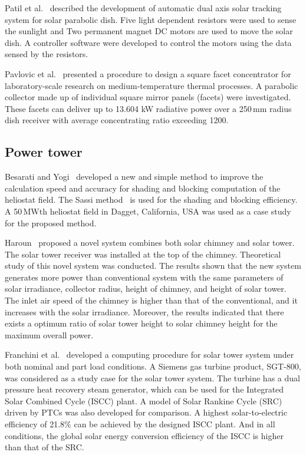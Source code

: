 Patil et al.~\cite{Patil2016} described the development of automatic dual axis solar tracking system for solar parabolic dish. Five light dependent resistors were used to sense the sunlight and Two permanent magnet DC motors are used to move the solar dish. A controller software were developed to control the motors using the data sensed by the resistors.

Pavlovic et al.~\cite{Pavlovic2014} presented a procedure to design a square facet concentrator for laboratory-scale research on medium-temperature thermal processes. A parabolic collector made up of individual square mirror panels (facets) were investigated. These facets can deliver up to 13.604 kW radiative power over a 250$\,\mathrm{mm}$ radius dish receiver with average concentrating ratio exceeding 1200.

\subsection{Power tower}\label{sec:st}

Besarati and Yogi~\cite{Besarati2014} developed a new and simple method to improve the calculation speed and accuracy for shading and blocking computation of the heliostat field. The Sassi method~\cite{Sassi1983} is used for the shading and blocking efficiency. A 50$\,\mathrm{MWth}$ heliostat field in Dagget, California, USA was used as a case study for the proposed method. 

Haroun~\cite{El2015} proposed a novel system combines both solar chimney and solar tower. The solar tower receiver was installed at the top of the chimney. Theoretical study of this novel system was conducted. The results shown that the new system generates more power than conventional system with the same parameters of solar irradiance, collector radius, height of chimney, and height of solar tower. The inlet air speed of the chimney is higher than that of the conventional, and it increases with the solar irradiance. Moreover, the results indicated that there exists a optimum ratio of solar tower height to solar chimney height for the maximum overall power.

Franchini et al.~\cite{Franchini2013} developed a computing procedure for solar tower system under both nominal and part load conditions. A Siemens gas turbine product, SGT-800, was considered as a study case for the solar tower system. The turbine has a dual pressure heat recovery steam generator, which can be used for the Integrated Solar Combined Cycle (ISCC) plant. A model of Solar Rankine Cycle (SRC) driven by PTCs was also developed for comparison. A highest solar-to-electric efficiency of 21.8\% can be achieved by the designed ISCC plant. And in all conditions, the global solar energy conversion efficiency of the ISCC is higher than that of the SRC.

